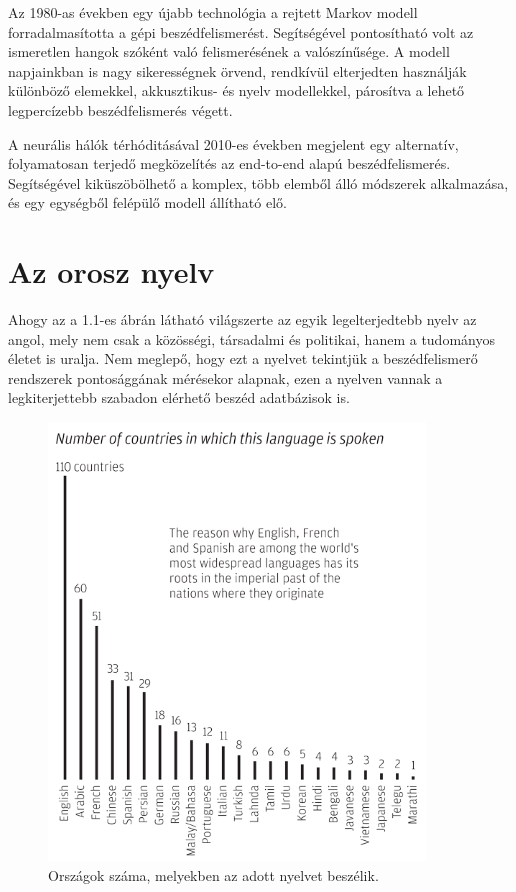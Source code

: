 Az 1980-as években egy újabb technológia a rejtett Markov modell forradalmasította a gépi beszédfelismerést. Segítségével pontosítható volt az ismeretlen hangok szóként való felismerésének a valószínűsége. A modell napjainkban is nagy sikerességnek örvend, rendkívül elterjedten használják különböző elemekkel, akkusztikus- és nyelv modellekkel, párosítva a lehető legpercízebb beszédfelismerés végett.

A neurális hálók térhóditásával 2010-es években megjelent egy alternatív, folyamatosan terjedő megközelítés az end-to-end alapú beszédfelismerés. Segítségével kiküszöbölhető a komplex, több elemből álló módszerek alkalmazása, és egy egységből felépülő modell állítható elő.

\section{Az orosz nyelv}

Ahogy az a 1.1-es ábrán látható világszerte az egyik legelterjedtebb nyelv az angol, mely nem csak a közösségi, társadalmi és politikai, hanem a tudományos életet is uralja. Nem meglepő, hogy ezt a nyelvet tekintjük a beszédfelismerő rendszerek pontosággának mérésekor alapnak, ezen a nyelven vannak a legkiterjettebb szabadon elérhető beszéd adatbázisok is.

\begin{figure}[!ht]
\centering
\includegraphics[width=100mm, keepaspectratio]{figures/countries_languages.png}
\caption{Országok száma, melyekben az adott nyelvet beszélik.}
\end{figure}

